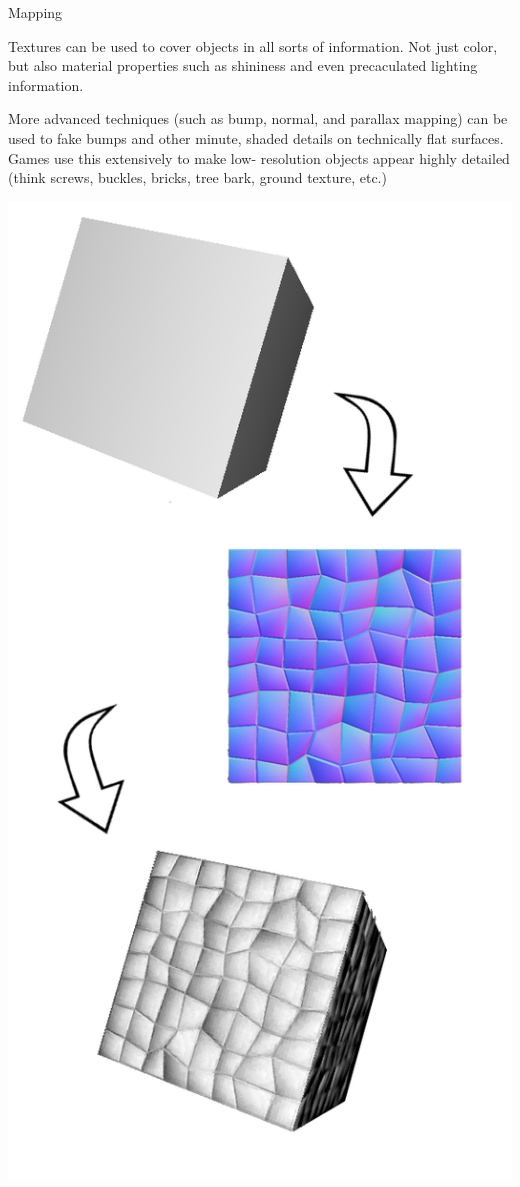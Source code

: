 \documentclass{lug}
\newcommand{\splitslide}[4]{
    \noindent
    \begin{minipage}{#1 \textwidth - #2 }
        #3
    \end{minipage}%
    \hspace{ \dimexpr #2 * 2 \relax }%
    \begin{minipage}{\textwidth - #1 \textwidth - #2 }
        #4
    \end{minipage}
}
\begin{document}
\begin{frame}{Mapping}
    \splitslide{0.65}{.7em}{
        \small

        Textures can be used to cover objects in all sorts of information. Not
        just color, but also material properties such as shininess and even
        precaculated lighting information.

        \vspace{1ex}

        More advanced techniques (such as bump, normal, and parallax mapping)
        can be used to fake bumps and other minute, shaded details on
        technically flat surfaces. Games use this extensively to make low-%
        resolution objects appear highly detailed (think screws, buckles,
        bricks, tree bark, ground texture, etc.)
 
    }{
        \includegraphics[width=\textwidth]{graphics/normal_map}
    }
\end{frame}
\end{document}
